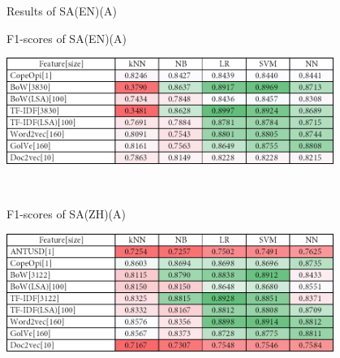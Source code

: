 \begin{table}
\caption{Results of SA(EN)(A)}
\label{tab:sa_en_a}
\centering
\begin{subtable}{\textwidth}
	\centering
	\caption{F1-scores of SA(EN)(A)}
	\includegraphics[width=0.8\textwidth]{./figure/01A1.png}
\end{subtable}\\[1em]
\begin{subtable}{\textwidth}
	\centering
	\caption{F1-scores of SA(ZH)(A)}
	\includegraphics[width=0.8\textwidth]{./figure/02A1.png}
\end{subtable}\\[1em]
\end{table}